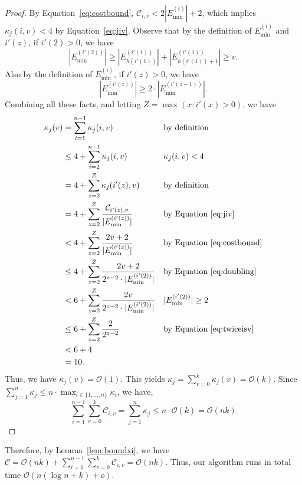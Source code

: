 \documentclass{article}
\newcommand{\ens}[1]{\ensuremath{#1}}					\newcommand{\card}[1]{\ens{|#1|}}							\newcommand{\dotlist}[2]{\ens{#1,\ldots,#2}}
\newcommand{\bigoh}[1]{\ens{\mathcal{O}(#1)}}				\newcommand{\bigom}[1]{\ens{\Omega(#1)}}
\newcommand{\mb}[1]{\mbox{#1}}
\newcommand{\xitot}{\ens{\mathcal C}}
\newcommand{\mergeop}[2]{\ens{E_{#2}^{(#1)}}}
\newcommand{\picost}[2]{\ens{\xitot_{#1,#2}}}
\newcommand{\minmega}[1]{\ens{E_{\min}^{(#1)}}}
\newcommand{\mindex}[1]{\ens{h(#1)}}
\newcommand{\opchargeind}[3]{\ens{\kappa_{#1}(#2,#3)}}
\newcommand{\opchargev}[2]{\ens{\kappa_{#1}(#2)}}
\newcommand{\opcharge}[1]{\ens{\kappa_{#1}}}
\newcommand{\indexsym}{\ens{i'}}
\newcommand{\chargenumvshort}[1]{\ens{\indexsym(#1)}}
\begin{document}
\begin{proof}
By Equation~\ref{eq:costbound}, $\picost iv < 2\card{\minmega i}+2$, which implies $\opchargeind jiv < 4$ by Equation~\ref{eq:jiv}.
Observe that by the definition of \minmega i and \chargenumvshort z, if $\chargenumvshort 2 > 0$, we have 
\begin{equation}
\label{eq:twiceisv}
\card{\minmega{\chargenumvshort 2}} \geq \card{\mergeop{\chargenumvshort 1}{\mindex{\chargenumvshort 1}}} + \card{\mergeop{\chargenumvshort 1}{\mindex{\chargenumvshort 1} + 1}} \geq v.
\end{equation}
Also by the definition of \minmega i, if $\chargenumvshort z > 0$, we have 
\begin{equation}
\label{eq:doubling}
\card{\minmega{\chargenumvshort z}} \geq 2\cdot \card{\minmega{\chargenumvshort {z-1}}}.
\end{equation} 
Combining all these facts, and letting $Z = \max(x: \chargenumvshort x > 0)$, we have
\begin{align*}
\opchargev jv 
&= \sum_{i=1}^{n-1} \opchargeind jiv && \mb{by definition}\\
&\leq 4+ \sum_{i=2}^{n-1} \opchargeind jiv && \opchargeind jiv < 4\\
&= 4 + \sum_{z=2}^{Z} \opchargeind j{\chargenumvshort z}v && \mb{by definition}\\
&= 4+ \sum_{z=2}^{Z} \frac{\picost {\chargenumvshort z}v}{\card{\minmega{\chargenumvshort z}}} && \mb{by Equation~\ref{eq:jiv}}\\
&< 4+ \sum_{z=2}^{Z} \frac{2v+2}{\card{\minmega{\chargenumvshort z}}} && \mb{by Equation~\ref{eq:costbound}}\\
&\leq 4+ \sum_{z=2}^{Z} \frac{2v+2}{2^{z-2}\cdot\card{\minmega{\chargenumvshort 2}}} && \mbox{by Equation~\ref{eq:doubling}}\\
&< 6+ \sum_{z=2}^{Z} \frac{2v}{2^{z-2}\cdot\card{\minmega{\chargenumvshort 2}}} && \card{\minmega{\chargenumvshort 2}}\geq 2\\
&\leq 6+ \sum_{z=2}^{Z} \frac{2}{2^{z-2}} && \mb{by Equation~\ref{eq:twiceisv}}\\
&< 6+ 4 \\
&= 10.
\end{align*}
Thus, we have $\opchargev jv = \bigoh{1}$. This yields $\opcharge j = \sum_{v=0}^{k} \opchargev jv = \bigoh{k}$.
Since $\sum_{j=1}^{n} \opcharge j \leq n\cdot \max_{i\in\{1,\ldots,n\}} \opcharge i$, we have, 
\begin{equation*}
\sum_{i=1}^{n-1}\sum_{v=0}^{k}\picost iv = \sum_{j=1}^{n} \opcharge j \leq n\cdot\bigoh{k} = \bigoh{nk}
\end{equation*}
\end{proof}
Therefore, by Lemma~\ref{lem:boundxi}, we have $\xitot = \bigoh{nk} + \sum_{i=1}^{n-1}\sum_{v=0}^{k}\picost iv = \bigoh{nk}.$
Thus, our algorithm runs in total time \bigoh{n(\log n+ k) + o}.
\end{document}
